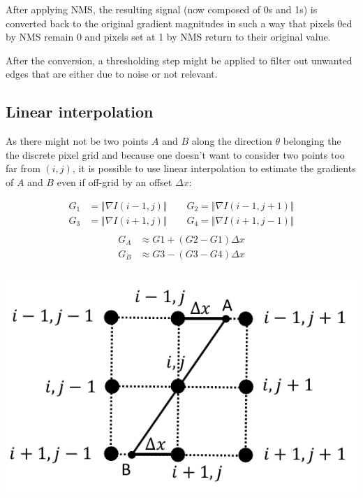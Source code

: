 \begin{remark}
    After applying NMS, the resulting signal (now composed of 0s and 1s) is converted back to the original gradient magnitudes
    in such a way that pixels 0ed by NMS remain 0 and pixels set at 1 by NMS return to their original value.

    After the conversion, a thresholding step might be applied to filter out unwanted edges that are either due to noise or not relevant.
\end{remark}


\subsection{Linear interpolation}

As there might not be two points $A$ and $B$ along the direction $\theta$ belonging the the discrete pixel grid
and because one doesn't want to consider two points too far from $(i, j)$,
it is possible to use linear interpolation to estimate the gradients of $A$ and $B$ even if off-grid by an offset $\Delta x$:\\
\begin{minipage}{0.6\linewidth}
    \[
        \begin{split}
            G_1 &= \Vert \nabla I(i-1, j) \Vert \hspace{2em} G_2 = \Vert \nabla I(i-1, j+1) \Vert \\
            G_3 &= \Vert \nabla I(i+1, j) \Vert \hspace{2em} G_4 = \Vert \nabla I(i+1, j-1) \Vert \\
        \end{split}
    \]
    \[
        \begin{split}
            G_A &\approx G1 + (G2 - G1)\Delta x \\
            G_B &\approx G3 - (G3 - G4)\Delta x \\
        \end{split}
    \]
\end{minipage}
\begin{minipage}{0.35\linewidth}
    \centering
    \includegraphics[width=\linewidth]{./img/_nms_interpolation.pdf}
\end{minipage}